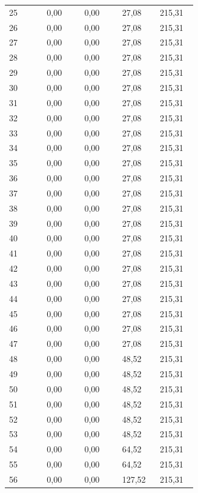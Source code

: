 \begin{longtable}{@{}p{0.171\linewidth}p{0.171\linewidth}p{0.171\linewidth}p{0.171\linewidth}p{0.171\linewidth}@{}}
25 & 0,00 & 0,00 & 27,08 & 215,31 \\
26 & 0,00 & 0,00 & 27,08 & 215,31 \\
27 & 0,00 & 0,00 & 27,08 & 215,31 \\
28 & 0,00 & 0,00 & 27,08 & 215,31 \\
29 & 0,00 & 0,00 & 27,08 & 215,31 \\
30 & 0,00 & 0,00 & 27,08 & 215,31 \\
31 & 0,00 & 0,00 & 27,08 & 215,31 \\
32 & 0,00 & 0,00 & 27,08 & 215,31 \\
33 & 0,00 & 0,00 & 27,08 & 215,31 \\
34 & 0,00 & 0,00 & 27,08 & 215,31 \\
35 & 0,00 & 0,00 & 27,08 & 215,31 \\
36 & 0,00 & 0,00 & 27,08 & 215,31 \\
37 & 0,00 & 0,00 & 27,08 & 215,31 \\
38 & 0,00 & 0,00 & 27,08 & 215,31 \\
39 & 0,00 & 0,00 & 27,08 & 215,31 \\
40 & 0,00 & 0,00 & 27,08 & 215,31 \\
41 & 0,00 & 0,00 & 27,08 & 215,31 \\
42 & 0,00 & 0,00 & 27,08 & 215,31 \\
43 & 0,00 & 0,00 & 27,08 & 215,31 \\
44 & 0,00 & 0,00 & 27,08 & 215,31 \\
45 & 0,00 & 0,00 & 27,08 & 215,31 \\
46 & 0,00 & 0,00 & 27,08 & 215,31 \\
47 & 0,00 & 0,00 & 27,08 & 215,31 \\
48 & 0,00 & 0,00 & 48,52 & 215,31 \\
49 & 0,00 & 0,00 & 48,52 & 215,31 \\
50 & 0,00 & 0,00 & 48,52 & 215,31 \\
51 & 0,00 & 0,00 & 48,52 & 215,31 \\
52 & 0,00 & 0,00 & 48,52 & 215,31 \\
53 & 0,00 & 0,00 & 48,52 & 215,31 \\
54 & 0,00 & 0,00 & 64,52 & 215,31 \\
55 & 0,00 & 0,00 & 64,52 & 215,31 \\
56 & 0,00 & 0,00 & 127,52 & 215,31 \\
\end{longtable}

